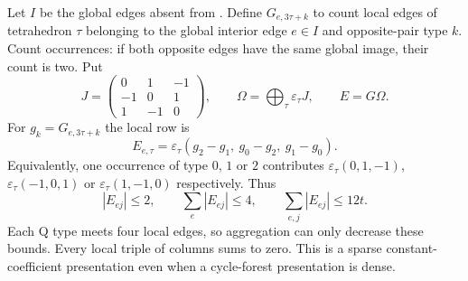 Let $I$ be the global edges absent from .  Define
$G_{e,3\tau+k}$ to count local edges of tetrahedron $\tau$ belonging to the
global interior edge $e\in I$ and opposite-pair type $k$.  Count occurrences:
if both opposite edges have the same global image, their count is two.
Put
\[
 J=\begin{pmatrix}0&1&-1\\-1&0&1\\1&-1&0\end{pmatrix},\qquad
 \Omega=\bigoplus_\tau\varepsilon_\tau J,\qquad E=G\Omega.
\]
For $g_k=G_{e,3\tau+k}$ the local row is
\[
 E_{e,\tau}=\varepsilon_\tau(g_2-g_1,\ g_0-g_2,\ g_1-g_0).
\]
Equivalently, one occurrence of type $0$, $1$ or $2$ contributes
$\varepsilon_\tau(0,1,-1)$, $\varepsilon_\tau(-1,0,1)$ or
$\varepsilon_\tau(1,-1,0)$ respectively.  Thus
\[
 |E_{ej}|\le2,\qquad \sum_e|E_{ej}|\le4,
 \qquad \sum_{e,j}|E_{ej}|\le12t.
\]
Each Q type meets four local edges, so aggregation can only decrease these
bounds.  Every local triple of columns sums to zero.  This is a sparse
constant-coefficient presentation even when a cycle-forest presentation is
dense.

